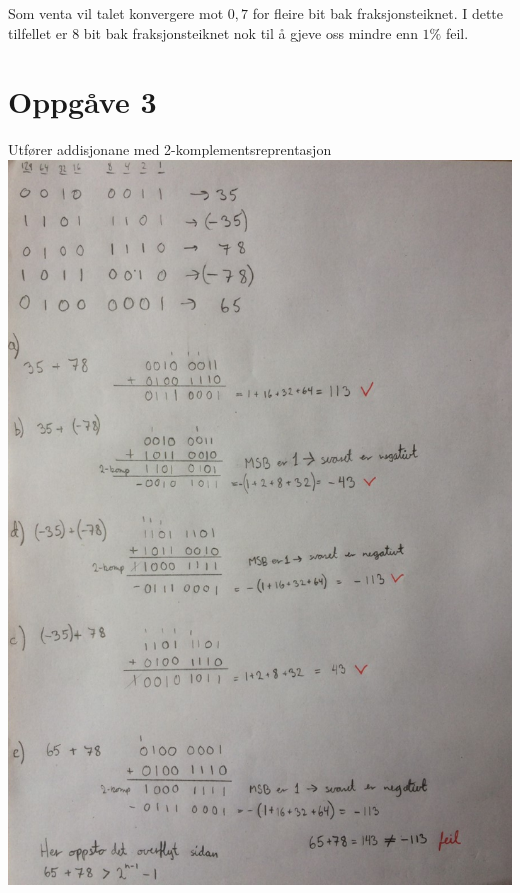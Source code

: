 \documentclass[12pt,a4paper]{article}
\begin{document}
    Som venta vil talet konvergere mot $0,7$ for fleire bit bak fraksjonsteiknet.
    I dette tilfellet er 8 bit bak fraksjonsteiknet nok til å gjeve oss mindre
    enn $1\%$ feil.
    
    
  \section{Oppgåve 3}
    Utfører addisjonane med 2-komplementsreprentasjon \\
    \includegraphics[width=\textwidth]{01_3.png}
  
\end{document}
